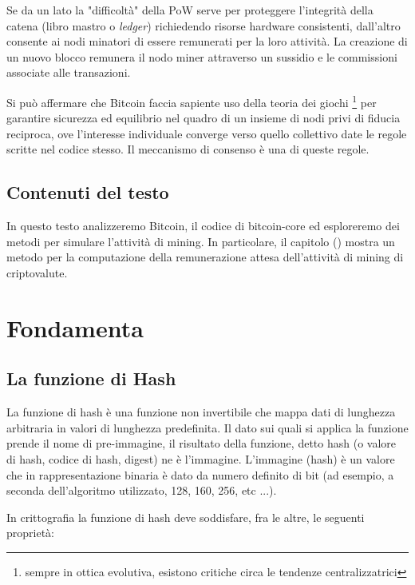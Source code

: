 \documentclass{article}
\begin{document}
Se da un lato la "difficoltà" della PoW serve per proteggere l'integrità della catena (libro mastro o \textit{ledger}) richiedendo risorse hardware consistenti,
dall'altro consente ai nodi minatori di essere remunerati per la loro attività. La creazione di un nuovo blocco remunera il nodo miner attraverso un sussidio e le commissioni associate alle transazioni. 

Si può affermare che Bitcoin faccia sapiente uso della teoria dei giochi \footnote{sempre in ottica evolutiva, esistono critiche circa le tendenze centralizzatrici} per garantire sicurezza ed equilibrio nel quadro di un insieme di nodi privi di fiducia reciproca, ove l'interesse individuale converge verso quello collettivo date le regole scritte nel codice stesso.
Il meccanismo di consenso è una di queste regole.

\subsection{Contenuti del testo}

In questo testo analizzeremo Bitcoin, il codice di bitcoin-core ed esploreremo dei metodi per simulare l'attività di mining.
In particolare, il capitolo () mostra un metodo per la computazione della remunerazione attesa dell'attività di mining di criptovalute.

\section{Fondamenta}

\subsection{La funzione di Hash}

La funzione di hash è una funzione non invertibile che mappa dati di lunghezza arbitraria in valori di lunghezza predefinita.
Il dato sui quali si applica la funzione prende il nome di pre-immagine, il risultato della funzione, detto hash (o valore di hash, codice di hash, digest) ne è l'immagine.
L'immagine (hash) è un valore che in rappresentazione binaria è dato da numero definito di bit (ad esempio, a seconda dell'algoritmo utilizzato, 128, 160, 256, etc ...).

In crittografia la funzione di hash deve soddisfare, fra le altre, le seguenti proprietà:
\end{document}
